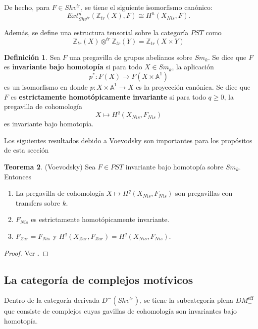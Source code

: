 \documentclass[10pt]{amsart}
\theoremstyle{definition}
\newtheorem{definition}{Definici\'on}[section]
\newtheorem{theorem}[definition]{Teorema}
\theoremstyle{remark}
\theoremstyle{definition}
\begin{document}
De hecho, para $F \in Shv^{tr}$, se tiene el siguiente isomorfismo canónico:
\begin{equation*}
Ext^{n}_{Shv^{tr}}(\mathbb{Z}_{tr}(X),F) \cong H^{n}(X_{Nis},F).
\end{equation*}

Además, se define una estructura tensorial sobre la categoría $PST$ como
\begin{equation*}
\mathbb{Z}_{tr}(X) \otimes^{tr} \mathbb{Z}_{tr}(Y)= \mathbb{Z}_{tr}(X \times Y)
\end{equation*}

\begin{definition} Sea $F$ una pregavilla de grupos abelianos sobre $Sm_{\mathit{k}}$. Se dice que $F$ es \textbf{invariante bajo homotopía} si para todo $X \in Sm_{\mathit{k}}$, la aplicación
\begin{equation*}
p^{*}:F(X) \rightarrow F(X \times \mathbb{A}^1)
\end{equation*}
es un isomorfismo en donde $p:X \times \mathbb{A}^{1} \rightarrow X$ es la proyección canónica. Se dice que $F$ es \textbf{estrictamente homotópicamente invariante} si para todo $q \geq 0$, la pregavilla de cohomología
\begin{equation*}
X \mapsto H^{q}(X_{Nis},F_{Nis})
\end{equation*}
es invariante bajo homotopía.
\end{definition}

Los siguientes resultados debido a Voevodsky son importantes para los propósitos de esta sección
\begin{theorem}(Voevodsky)
Sea $F \in PST$ invariante bajo homotopía sobre $Sm_{\mathit{k}}$. Entonces
\begin{enumerate}
\item La pregavilla de cohomología $X \mapsto H^{q}(X_{Nis},F_{Nis})$ son pregavillas con transfers sobre $\mathit{k}$.
\item $F_{Nis}$ es estrictamente homotópicamente invariante.
\item $F_{Zar}=F_{Nis}$ y $H^{q}(X_{Zar},F_{Zar})=H^{q}(X_{Nis},F_{Nis})$.
\end{enumerate}
\end{theorem}

\begin{proof}
Ver \cite[Ch. 3, Thm. 4.27 y Thm. 5.7]{Voe00a}.
\end{proof}

\subsection{La categoría de complejos motívicos}
Dentro de la categoría derivada $D^{-}(Shv^{tr})$, se tiene la subcategoría plena $DM^{\textrm{eff}}_{-}$ que consiste de complejos cuyas gavillas de cohomología son invariantes bajo homotopía.
\end{document}
